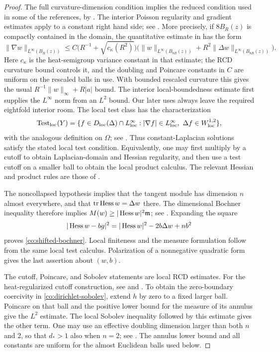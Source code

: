 \begin{proof}
The full curvature-dimension condition implies the reduced condition
used in some of the references, by \cite[Proposition~2.5(i)]{BS10}.
The interior Poisson regularity and gradient estimates apply to a
constant right hand side; see \cite{Kell13,Jiang14}.  More precisely,
if \(8B_R(z)\) is compactly contained in the domain, the quantitative
estimate in \cite[Theorem~3.1]{Jiang14} has the form
\[
 \|\nabla w\|_{L^\infty(B_R(z))}
 \le C\bigl(R^{-1}+\sqrt{c_\kappa(R^2)}\bigr)
       \bigl(\|w\|_{L^\infty(B_{8R}(z))}
                  +R^2\|\Delta w\|_{L^\infty(B_{8R}(z))}\bigr).
\]
Here \(c_\kappa\) is the heat-semigroup variance constant in that
estimate; the RCD curvature bound controls it, and the doubling and
Poincare constants in \(C\) are uniform on the rescaled balls in
use.  With bounded rescaled curvature this gives the usual
\(R^{-1}\|w\|_\infty+R|a|\) bound.  The interior local-boundedness
estimate first supplies the \(L^\infty\) norm from an \(L^2\) bound.
Our later uses always leave the required eightfold interior room.
The local test
class has the characterization
\[
 \operatorname{Test}_{\rm loc}(Y)
 =\{f\in D_{\rm loc}(\Delta)\cap L^\infty_{\rm loc}:
       |\nabla f|\in L^\infty_{\rm loc},\ 
       \Delta f\in W^{1,2}_{\rm loc}\},
\]
with the analogous definition on \(\Omega\); see
\cite[Lemmas~2.6--2.7]{CDNZPSW}.  Thus constant-Laplacian solutions
satisfy the stated local test condition.  Equivalently, one may
first multiply by a cutoff to obtain Laplacian-domain and Hessian
regularity, and then use a test cutoff on a smaller ball to obtain
the local product calculus.  The relevant Hessian and product rules
are those of \cite{Gigli18}.

The noncollapsed hypothesis implies that the tangent module has
dimension \(n\) almost everywhere, and that
\(\operatorname{tr}\operatorname{Hess} w=\Delta w\) there.  The dimensional Bochner inequality
therefore implies \(M(w)\ge|\operatorname{Hess} w|^2\mathfrak m\); see
\cite{DPG18,Han18}.  Expanding the square
\[
 |\operatorname{Hess} w-bg|^2=|\operatorname{Hess} w|^2-2b\Delta w+nb^2
\]
proves \eqref{co:shifted-bochner}.  Local finiteness and the
measure formulation follow from the same local test calculus.
Polarization of a nonnegative quadratic form gives the last
assertion about \((w,b)\).

The cutoff, Poincare, and Sobolev statements are local RCD
estimates.  For the heat-regularized cutoff construction, see
\cite[Lemma~3.1]{MN19} and \cite[Lemma~2.6]{CDNZPSW}.
To obtain the zero-boundary coercivity in
\eqref{co:dirichlet-sobolev}, extend \(h\) by zero to a fixed larger
ball.  Poincare on that ball and the positive lower bound for the
measure of its annulus give the \(L^2\) estimate.  The local Sobolev
inequality followed by this estimate gives the other term.  One
may use an effective doubling dimension larger than both \(n\)
and \(2\), so that \(d_*>1\) also when \(n=2\); see
\cite[Theorem~5.1 and the following Remark~3]{HK00}. The annulus lower
bound and all constants are uniform for the almost Euclidean balls
used below.
\end{proof}

